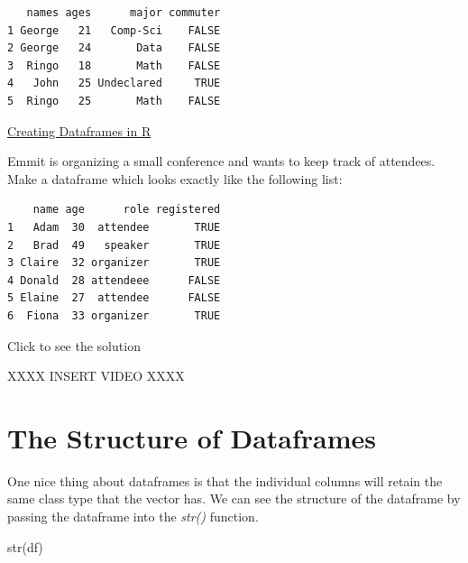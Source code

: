 \documentclass[
  letterpaper,
  DIV=11,
  numbers=noendperiod]{scrreprt}
\newenvironment{Shaded}{\begin{snugshade}}{\end{snugshade}}
\newcommand{\FunctionTok}[1]{\textcolor[rgb]{0.28,0.35,0.67}{#1}}
\newcommand{\NormalTok}[1]{\textcolor[rgb]{0.00,0.23,0.31}{#1}}
\begin{document}
\begin{verbatim}
   names ages      major commuter
1 George   21   Comp-Sci    FALSE
2 George   24       Data    FALSE
3  Ringo   18       Math    FALSE
4   John   25 Undeclared     TRUE
5  Ringo   25       Math    FALSE
\end{verbatim}

\begin{watch}{}{}
    \href{https://youtu.be/KjMZt7-YDVQ}{Creating Dataframes in R}
\end{watch}

\begin{tcolorbox}[enhanced jigsaw, colbacktitle=quarto-callout-tip-color!10!white, breakable, bottomrule=.15mm, colframe=quarto-callout-tip-color-frame, left=2mm, opacitybacktitle=0.6, title=\textcolor{quarto-callout-tip-color}{\faLightbulb}\hspace{0.5em}{Try it Out}, leftrule=.75mm, opacityback=0, rightrule=.15mm, titlerule=0mm, bottomtitle=1mm, colback=white, toprule=.15mm, arc=.35mm, toptitle=1mm, coltitle=black]

Emmit is organizing a small conference and wants to keep track of
attendees. Make a dataframe which looks exactly like the following list:

\begin{verbatim}
    name age      role registered
1   Adam  30  attendee       TRUE
2   Brad  49   speaker       TRUE
3 Claire  32 organizer       TRUE
4 Donald  28 attendeee      FALSE
5 Elaine  27  attendee      FALSE
6  Fiona  33 organizer       TRUE
\end{verbatim}

Click to see the solution

XXXX INSERT VIDEO XXXX

\end{tcolorbox}

\section{The Structure of Dataframes}\label{the-structure-of-dataframes}

One nice thing about dataframes is that the individual columns will
retain the same class type that the vector has. We can see the structure
of the dataframe by passing the dataframe into the \emph{str()}
function.

\begin{Shaded}
\begin{Highlighting}[]
\FunctionTok{str}\NormalTok{(df)}
\end{Highlighting}
\end{Shaded}
\end{document}
